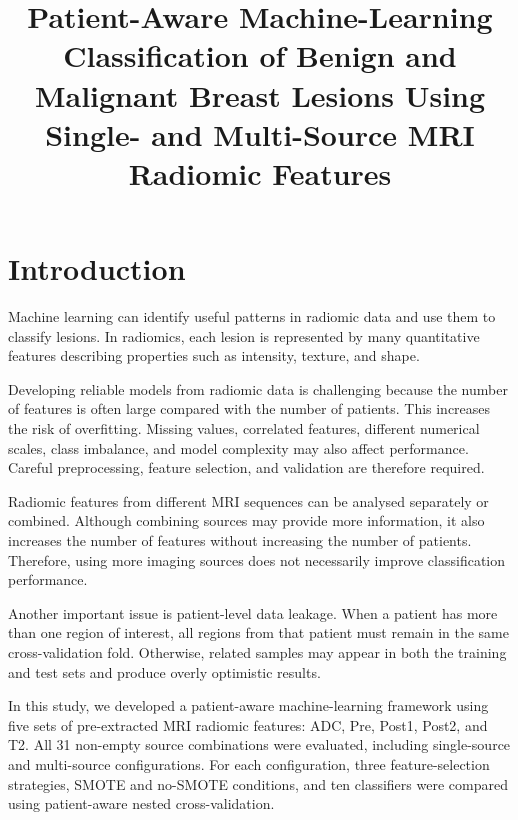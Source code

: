 \documentclass[12pt,twocolumn]{article}
\title{
    \textbf{
        Patient-Aware Machine-Learning Classification of Benign and Malignant Breast Lesions Using Single- and Multi-Source MRI Radiomic Features
    }
}
\date{}
\begin{document}
\maketitle




\begin{abstract}



\end{abstract}


\section{Introduction}
\label{sec:introduction}

Machine learning can identify useful patterns in radiomic data and use
them to classify lesions. In radiomics, each lesion is represented by
many quantitative features describing properties such as intensity,
texture, and shape.

Developing reliable models from radiomic data is challenging because
the number of features is often large compared with the number of
patients. This increases the risk of overfitting. Missing values,
correlated features, different numerical scales, class imbalance, and
model complexity may also affect performance. Careful preprocessing,
feature selection, and validation are therefore required.

Radiomic features from different MRI sequences can be analysed
separately or combined. Although combining sources may provide more
information, it also increases the number of features without
increasing the number of patients. Therefore, using more imaging
sources does not necessarily improve classification performance.

Another important issue is patient-level data leakage. When a patient
has more than one region of interest, all regions from that patient
must remain in the same cross-validation fold. Otherwise, related
samples may appear in both the training and test sets and produce
overly optimistic results.

In this study, we developed a patient-aware machine-learning framework
using five sets of pre-extracted MRI radiomic features: ADC, Pre,
Post1, Post2, and T2. All 31 non-empty source combinations were
evaluated, including single-source and multi-source configurations.
For each configuration, three feature-selection strategies, SMOTE and
no-SMOTE conditions, and ten classifiers were compared using
patient-aware nested cross-validation.
\end{document}
